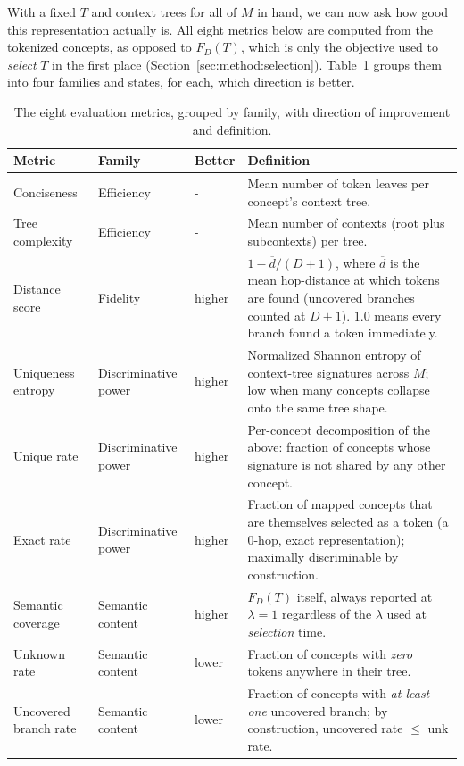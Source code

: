 With a fixed $T$ and context trees for all of $M$ in hand, we can now ask
how good this representation actually is. All eight metrics below are
computed from the tokenized concepts, as opposed to $F_D(T)$,
which is only the objective used to \emph{select} $T$ in the first place
(Section~\ref{sec:method:selection}). Table~\ref{tab:metrics} groups them
into four families and states, for each, which direction is better. 

\begin{table}[h]
\centering
\small
\begin{tabular}{p{2.3cm}p{2.0cm}p{1.0cm}p{5.5cm}}
\toprule
\textbf{Metric} & \textbf{Family} & \textbf{Better} & \textbf{Definition} \\
\midrule
Conciseness & Efficiency & -& Mean number of token leaves per concept's context tree. \\
Tree complexity & Efficiency & -& Mean number of contexts (root plus subcontexts) per tree. \\
Distance score & Fidelity & higher & $1 - \overline{d}/(D{+}1)$, where $\overline{d}$ is the mean hop-distance at which tokens are found (uncovered branches counted at $D{+}1$). $1.0$ means every branch found a token immediately. \\
Uniqueness entropy & Discriminative power & higher & Normalized Shannon entropy of context-tree signatures across $M$; low when many concepts collapse onto the same tree shape. \\
Unique rate & Discriminative power & higher & Per-concept decomposition of the above: fraction of concepts whose signature is not shared by any other concept. \\
Exact rate & Discriminative power & higher & Fraction of mapped concepts that are themselves selected as a token (a $0$-hop, exact representation); maximally discriminable by construction. \\
Semantic coverage & Semantic content & higher & $F_D(T)$ itself, always reported at $\lambda=1$ regardless of the $\lambda$ used at \emph{selection} time. \\
Unknown rate& Semantic content & lower & Fraction of concepts with \emph{zero} tokens anywhere in their tree. \\
Uncovered branch rate & Semantic content & lower & Fraction of concepts with \emph{at least one} uncovered branch; by construction, uncovered rate $\le$ unk rate. \\
\bottomrule
\end{tabular}
\caption{The eight evaluation metrics, grouped by family, with direction of improvement and definition.}
\label{tab:metrics}
\end{table}

